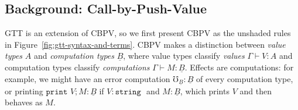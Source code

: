 \documentclass[acmsmall,screen,12pt]{acmart}
\renewcommand{\u}{\underline}
\newcommand{\err}{\mho}
\newcommand{\print}{\kw{print}}
\newcommand{\kw}[1]{\texttt{#1}\,\,}
\begin{document}
\subsection{Background: Call-by-Push-Value}

GTT is an extension of CBPV, so we first present CBPV as the unshaded rules in
Figure~\ref{fig:gtt-syntax-and-terms}.  CBPV makes a distinction between
\emph{value types} $A$ and \emph{computation types} $\u B$, where value
types classify \emph{values} $\Gamma \vdash V : A$ and computation types
classify \emph{computations} $\Gamma \vdash M : \u B$.  Effects are
computations: for example, we might have an error computation $\err_{\u
  B} : \u B$ of every computation type, or printing $\print V;M : \u B$
if $V : \kw{string}$ and $M : \u B$, which prints $V$ and then behaves as
$M$.
\end{document}
